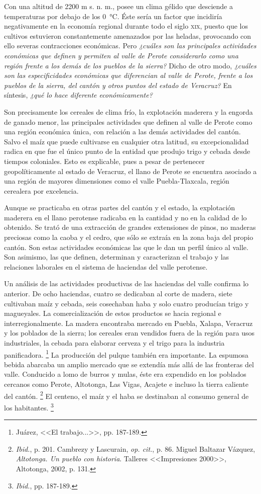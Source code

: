 \documentclass[14pt,twoside,final]{extbook} %
\let\oldfootnote\footnote
\renewcommand\footnote[1]{%
\oldfootnote{\hspace{1mm}#1}}
\begin{document}
Con una altitud de 2200 m s. n. m., posee un clima gélido que desciende a temperaturas por debajo de los 0~°C. Éste sería un factor que incidiría negativamente en la economía regional durante todo el siglo \textsc{xix}, puesto que los cultivos estuvieron constantemente amenazados por las heladas, provocando con ello severas contracciones económicas. Pero \emph{¿cuáles son las principales
actividades económicas que definen y permiten al valle de Perote considerarlo como una región frente a los demás de los pueblos de la sierra?} Dicho de otro modo, \emph{¿cuáles son las especificidades económicas que diferencian al valle de Perote, frente a los pueblos de la sierra, del cantón y otros puntos del estado de Veracruz?} En síntesis, \emph{¿qué lo hace diferente económicamente?}

Son precisamente los cereales de clima frío, la explotación maderera y la engorda de ganado menor, las principales actividades que definen al valle de Perote como una región económica única, con relación a las demás actividades del cantón. Salvo el maíz que puede cultivarse en cualquier otra latitud, su excepcionalidad radica en que fue el único punto de la entidad que produjo trigo y cebada desde tiempos coloniales. Esto es explicable, pues a pesar de pertenecer geopolíticamente al estado de Veracruz, el llano de Perote se encuentra asociado a una región de mayores dimensiones como el valle Puebla-Tlaxcala, región cerealera por excelencia.

Aunque se practicaba en otras partes del cantón y el estado, la explotación maderera en el llano perotense radicaba en la cantidad y no en la calidad de lo obtenido. Se trató de una extracción de grandes extensiones de pinos, no maderas preciosas como la caoba y el cedro, que sólo se extraía en la zona baja del propio cantón. Son estas actividades económicas las que le dan un perfil único al valle. Son asimismo, las que definen, determinan y caracterizan el trabajo y las relaciones laborales en el sistema de haciendas del valle perotense.

Un análisis de las actividades productivas de las haciendas del valle confirma lo anterior. De ocho haciendas, cuatro se dedicaban al corte de madera, siete cultivaban maíz y cebada, seis cosechaban haba y solo cuatro producían trigo y magueyales. La comercialización de estos productos se hacia regional e interregionalmente. La madera encontraba mercado en Puebla, Xalapa, Veracruz y los poblados de la sierra; los cereales eran vendidos fuera de la región para usos industriales, la cebada para elaborar cerveza y el trigo para la industria panificadora.\footnote{Juárez, <<El trabajo...>>, pp. 187-189.} La producción del pulque también era importante. La espumosa bebida abarcaba un amplio mercado que se extendía más allá de las fronteras del valle. Conducido a lomo de burros y mulas, éste era expendido en los poblados cercanos como Perote, Altotonga, Las Vigas, Acajete e incluso la tierra caliente del cantón.\footnote{\emph{Ibid.}, p. 201. Cambrezy y Lascurain, \emph{op. cit.}, p. 86. Miguel Baltazar Vázquez, \emph{Altotonga. Un pueblo con historia}. Talleres <<Impresiones 2000>>, Altotonga, 2002, p. 131.} El centeno, el maíz y el haba se destinaban al consumo general de los habitantes.\footnote{\emph{Ibid.}, pp. 187-189.}
\end{document}
